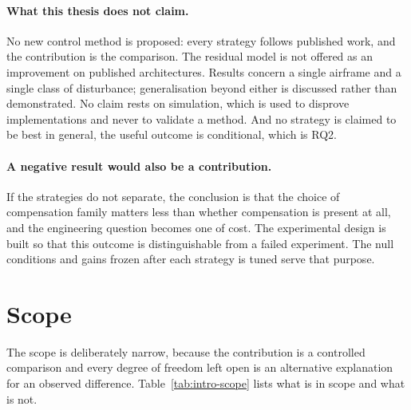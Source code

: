 \paragraph{What this thesis does not claim.} No new control method is proposed: every strategy
follows published work, and the contribution is the comparison. The residual model is not offered
as an improvement on published architectures. Results concern a single airframe and a single class
of disturbance; generalisation beyond either is discussed rather than demonstrated. No claim rests
on simulation, which is used to disprove implementations and never to validate a method. And no
strategy is claimed to be best in general, the useful outcome is conditional, which is RQ2.

\paragraph{A negative result would also be a contribution.} If the strategies do not separate, the
conclusion is that the choice of compensation family matters less than whether compensation is
present at all, and the engineering question becomes one of cost. The experimental design is built so that this outcome is distinguishable from a failed experiment.
The null conditions and gains frozen after each strategy is tuned serve that purpose.


\section{Scope}
\label{sec:intro-scope}

The scope is deliberately narrow, because the contribution is a controlled comparison and every
degree of freedom left open is an alternative explanation for an observed difference.
Table~\ref{tab:intro-scope} lists what is in scope and what is not.

